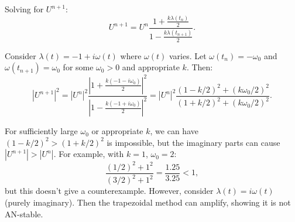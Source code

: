 \documentclass{article}
\begin{document}
\begin{enumerate}[(a)]
  Solving for $U^{n+1}$:
  \[
  U^{n+1} = U^n \frac{1 + \frac{k\lambda(t_n)}{2}}{1 - \frac{k\lambda(t_{n+1})}{2}}.
  \]

  Consider $\lambda(t) = -1 + i\omega(t)$ where $\omega(t)$ varies. Let $\omega(t_n) = -\omega_0$ and $\omega(t_{n+1}) = \omega_0$ for some $\omega_0 > 0$ and appropriate $k$. Then:
  \[
  |U^{n+1}|^2 = |U^n|^2 \frac{|1 + \frac{k(-1-i\omega_0)}{2}|^2}{|1 - \frac{k(-1+i\omega_0)}{2}|^2} = |U^n|^2 \frac{(1-k/2)^2 + (k\omega_0/2)^2}{(1+k/2)^2 + (k\omega_0/2)^2}.
  \]

  For sufficiently large $\omega_0$ or appropriate $k$, we can have $(1-k/2)^2 > (1+k/2)^2$ is impossible, but the imaginary parts can cause $|U^{n+1}| > |U^n|$. For example, with $k = 1$, $\omega_0 = 2$:
  \[
  \frac{(1/2)^2 + 1^2}{(3/2)^2 + 1^2} = \frac{1.25}{3.25} < 1,
  \]
  but this doesn't give a counterexample. However, consider $\lambda(t) = i\omega(t)$ (purely imaginary). Then the trapezoidal method can amplify, showing it is not AN-stable.
\end{enumerate}
\end{document}
